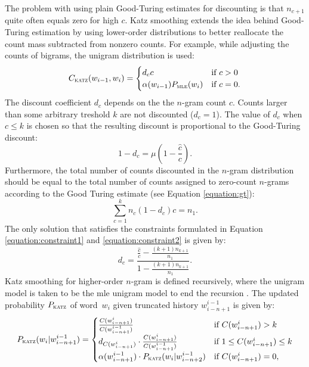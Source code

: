 	The problem with using plain Good-Turing estimates for discounting is that $n_{c+1}$ quite often equals zero for high $c$. Katz smoothing extends the idea behind Good-Turing estimation by using lower-order distributions to better reallocate the count mass subtracted from nonzero counts. For example, while adjusting the counts of bigrams, the unigram distribution is used: 
	\begin{equation}
		C_{\textsc{katz}}(w_{i-1}, w_{i})=
		\begin{cases}
			d_{c}c & \text{if } c>0 \\
			\alpha(w_{i-1})P_{\textsc{mle}}(w_{i}) & \text{if } c=0.
		\end{cases}
	\end{equation}
	The discount coefficient $d_{c}$ depends on the the \mbox{$n$-gram} count $c$. Counts larger than some arbitrary treshold $k$ are not discounted ($d_{c}=1$). The value of $d_{c}$ when $c\leq k$ is chosen so that the resulting discount is proportional to the Good-Turing discount: 
	\begin{equation}
		1-d_{c}=\mu(1-\frac{\hat{c}}{c}).
		\label{equation:constraint1}
	\end{equation}
	Furthermore, the total number of counts discounted in the \mbox{$n$-gram} distribution should be equal to the total number of counts assigned to zero-count \mbox{$n$-grams} according to the Good Turing estimate (see Equation \ref{equation:gt}):
	\begin{equation}
		\sum_{c=1}^{k}n_{c}(1-d_{c})c=n_{1}.
		\label{equation:constraint2}
	\end{equation}
	The only solution that satisfies the constraints formulated in Equation \ref{equation:constraint1} and \ref{equation:constraint2} is given by:
	\begin{equation}
		d_{c}=\frac{\frac{\hat{c}}{c}-\frac{(k+1)n_{k+1}}{n_{1}}}{1-\frac{(k+1)n_{k+1}}{n_{1}}}.
		\label{equation:dc}
	\end{equation}
	Katz smoothing for higher-order \mbox{$n$-gram} is defined recursively, where the unigram model is taken to be the \gls{mle} unigram model to end the recursion \cite{whittaker2000statistical}. The updated probability $P_{\textsc{katz}}$ of word~$w_{i}$ given truncated history $w_{i-n+1}^{i-1}$ is given by:
        \begin{equation}
        P_{\textsc{katz}}(w_{i}|w_{i-n+1}^{i-1})=
        \begin{cases}
           \frac{C(w_{i-n+1}^{i})}{C(w_{i-n+1}^{i-1})}& \text{if }C(w_{i-n+1}^{i}) > k\\
           d_{C(w_{i-n+1}^{i})}\cdot \frac{C(w_{i-n+1}^{i})}{C(w_{i-n+1}^{i-1})}& \text{if } 1\leq C(w_{i-n+1}^{i})\leq k\\
           \alpha(w_{i-n+1}^{i-1})\cdot P_{\textsc{katz}}(w_{i}|w_{i-n+2}^{i-1})& \text{if } C(w_{i-n+1}^{i})=0,
        \end{cases}
        \end{equation}
